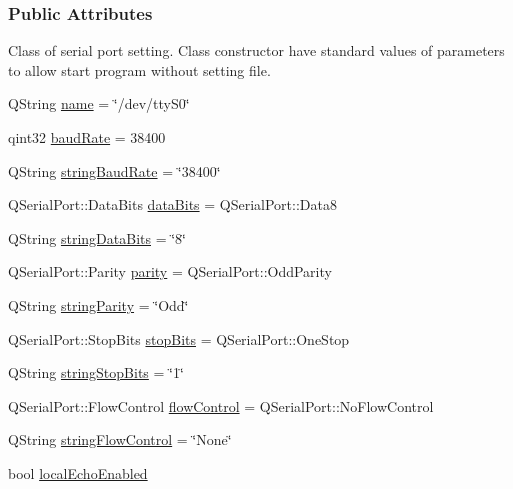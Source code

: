 \subsubsection*{Public Attributes}
Class of serial port setting. Class constructor have standard values of parameters to allow start program without setting file.
\begin{DoxyCompactItemize}
\item 
Q\+String \mbox{\hyperlink{structComSettings_aa21bef90f0730ae8f8f9f1ac612b4df0}{name}} = \char`\"{}/dev/tty\+S0\char`\"{}
\item 
qint32 \mbox{\hyperlink{structComSettings_ac34ef26d447e9053d85a3903f03f0f7e}{baud\+Rate}} = 38400
\item 
Q\+String \mbox{\hyperlink{structComSettings_a9d5a88e240b19b863c419d5cc05a4dec}{string\+Baud\+Rate}} = \char`\"{}38400\char`\"{}
\item 
Q\+Serial\+Port\+::\+Data\+Bits \mbox{\hyperlink{structComSettings_ac8eaec9f8e7a2951da30d16eff34c168}{data\+Bits}} = Q\+Serial\+Port\+::\+Data8
\item 
Q\+String \mbox{\hyperlink{structComSettings_a25ee68c643918b6c13f8e4e64a788c38}{string\+Data\+Bits}} = \char`\"{}8\char`\"{}
\item 
Q\+Serial\+Port\+::\+Parity \mbox{\hyperlink{structComSettings_a942d958bcaa7273d5b6589f92c922340}{parity}} = Q\+Serial\+Port\+::\+Odd\+Parity
\item 
Q\+String \mbox{\hyperlink{structComSettings_a21ad6c84428128867457f1e706500bcb}{string\+Parity}} = \char`\"{}Odd\char`\"{}
\item 
Q\+Serial\+Port\+::\+Stop\+Bits \mbox{\hyperlink{structComSettings_a3af1f4b81a956d46593badf8ea8a95ea}{stop\+Bits}} = Q\+Serial\+Port\+::\+One\+Stop
\item 
Q\+String \mbox{\hyperlink{structComSettings_a54ce036a24023acdd4b9f6460c7686c8}{string\+Stop\+Bits}} = \char`\"{}1\char`\"{}
\item 
Q\+Serial\+Port\+::\+Flow\+Control \mbox{\hyperlink{structComSettings_af719ceaf041eb31db53b2e5c189e0253}{flow\+Control}} = Q\+Serial\+Port\+::\+No\+Flow\+Control
\item 
Q\+String \mbox{\hyperlink{structComSettings_a23a3960bb4a476e74b49d1369352e7cc}{string\+Flow\+Control}} = \char`\"{}None\char`\"{}
\item 
bool \mbox{\hyperlink{structComSettings_ad276c73c919360c5bc5ff7996a2b6424}{local\+Echo\+Enabled}}
\end{DoxyCompactItemize}

